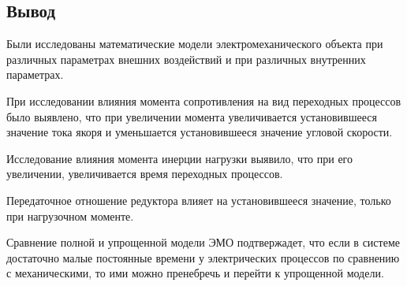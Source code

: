 \documentclass[a4paper, 12pt]{article}
\begin{document}
\newpage
\begin{center}
	\section*{Вывод} 
\end{center}

Были исследованы математические модели электромеханического объекта при различных параметрах внешних воздействий и при различных внутренних параметрах.\par
При исследовании влияния момента сопротивления на вид переходных процессов было выявлено, что при увеличении момента увеличивается установившееся значение тока якоря и уменьшается установившееся значение угловой скорости.\par
Исследование влияния момента инерции нагрузки выявило, что при его увеличении, увеличивается время переходных процессов.\par
Передаточное отношение редуктора влияет на установившееся значение, только при нагрузочном моменте.\par 
Сравнение полной и упрощенной модели ЭМО подтвержадет, что если в системе достаточно малые постоянные времени у электрических процессов по сравнению с механическими, то ими можно пренебречь и перейти к упрощенной модели. 
\end{document}
